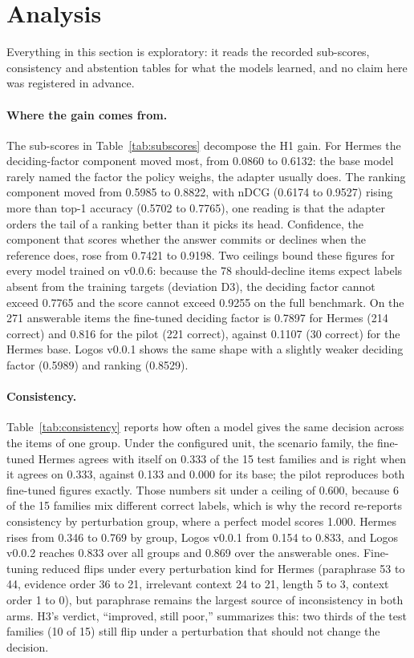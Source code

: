 \section{Analysis}\label{sec:analysis}

Everything in this section is exploratory: it reads the recorded sub-scores, consistency and abstention tables for what the models learned, and no claim here was registered in advance.

\paragraph{Where the gain comes from.}
The sub-scores in Table~\ref{tab:subscores} decompose the H1 gain. For Hermes the deciding-factor component moved most, from 0.0860 to 0.6132: the base model rarely named the factor the policy weighs, the adapter usually does. The ranking component moved from 0.5985 to 0.8822, with nDCG (0.6174 to 0.9527) rising more than top-1 accuracy (0.5702 to 0.7765), one reading is that the adapter orders the tail of a ranking better than it picks its head. Confidence, the component that scores whether the answer commits or declines when the reference does, rose from 0.7421 to 0.9198. Two ceilings bound these figures for every model trained on v0.0.6: because the 78 should-decline items expect labels absent from the training targets (deviation D3), the deciding factor cannot exceed 0.7765 and the score cannot exceed 0.9255 on the full benchmark. On the 271 answerable items the fine-tuned deciding factor is 0.7897 for Hermes (214 correct) and 0.816 for the pilot (221 correct), against 0.1107 (30 correct) for the Hermes base. Logos v0.0.1 shows the same shape with a slightly weaker deciding factor (0.5989) and ranking (0.8529).

\paragraph{Consistency.}
Table~\ref{tab:consistency} reports how often a model gives the same decision across the items of one group. Under the configured unit, the scenario family, the fine-tuned Hermes agrees with itself on 0.333 of the 15 test families and is right when it agrees on 0.333, against 0.133 and 0.000 for its base; the pilot reproduces both fine-tuned figures exactly. Those numbers sit under a ceiling of 0.600, because 6 of the 15 families mix different correct labels, which is why the record re-reports consistency by perturbation group, where a perfect model scores 1.000. Hermes rises from 0.346 to 0.769 by group, Logos v0.0.1 from 0.154 to 0.833, and Logos v0.0.2 reaches 0.833 over all groups and 0.869 over the answerable ones. Fine-tuning reduced flips under every perturbation kind for Hermes (paraphrase 53 to 44, evidence order 36 to 21, irrelevant context 24 to 21, length 5 to 3, context order 1 to 0), but paraphrase remains the largest source of inconsistency in both arms. H3's verdict, ``improved, still poor,'' summarizes this: two thirds of the test families (10 of 15) still flip under a perturbation that should not change the decision.

